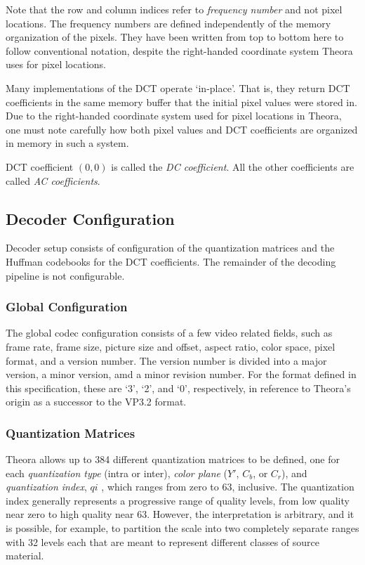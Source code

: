 \documentclass[11pt,letterpaper]{article}
\newcommand{\qi}{\ensuremath{\mathit{qi}} }
\newcommand{\term}[1]{{\em #1}}
\begin{document}
Note that the row and column indices refer to {\em frequency number} and not
 pixel locations.
The frequency numbers are defined independently of the memory organization of
 the pixels.
They have been written from top to bottom here to follow conventional notation,
 despite the right-handed coordinate system Theora uses for pixel locations.

Many implementations of the DCT operate `in-place'.
That is, they return DCT coefficients in the same memory buffer that the
 initial pixel values were stored in.
Due to the right-handed coordinate system used for pixel locations in Theora,
 one must note carefully how both pixel values and DCT coefficients are
 organized in memory in such a system.

DCT coefficient $(0,0)$ is called the \term{DC coefficient}.
All the other coefficients are called \term{AC coefficients}.

\subsection{Decoder Configuration}

Decoder setup consists of configuration of the quantization matrices and the
 Huffman codebooks for the DCT coefficients.
The remainder of the decoding pipeline is not configurable.

\subsubsection{Global Configuration}

The global codec configuration consists of a few video related fields, such as
 frame rate, frame size, picture size and offset, aspect ratio, color space,
 pixel format, and a version number.
The version number is divided into a major version, a minor version, amd a
 minor revision number.
For the format defined in this specification, these are `3', `2', and
 `0', respectively, in reference to Theora's origin as a successor to the VP3.2
 format.

\subsubsection{Quantization Matrices}

Theora allows up to 384 different quantization matrices to be defined, one for
 each \term{quantization type} (intra or inter), \term{color plane}
 ($Y'$, $C_b$, or $C_r$), and \term{quantization index}, \qi, which ranges from
 zero to 63, inclusive.
The quantization index generally represents a progressive range of quality
 levels, from low quality near zero to high quality near 63.
However, the interpretation is arbitrary, and it is possible, for example, to
 partition the scale into two completely separate ranges with 32 levels each
 that are meant to represent different classes of source material.
\end{document}
